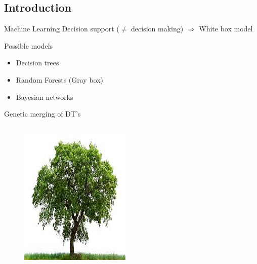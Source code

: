 \documentclass[english]{beamer}
\begin{document}
\subsection*{Introduction}
\begin{frame}{Machine Learning}
	\only<2>{}
	Decision support ($\neq$ decision making) $\Rightarrow$ White box model
	\begin{block}{Possible models}
		\begin{itemize}
			\item { Decision trees}
			\item Random Forests (Gray box)
			\item Bayesian networks
		\end{itemize}
	\end{block}
\end{frame}
\begin{frame}{Genetic merging of DT's}
	\begin{columns}
		\begin{column}{0.25\textwidth}
			\centering
			\begin{figure}
				\includegraphics[width=\textwidth]{figures/oak.jpg}

\end{figure}
\end{column}
\end{columns}
\end{frame}
\end{document}
